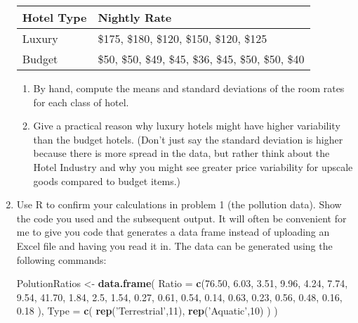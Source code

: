 \documentclass[]{book}
\newenvironment{Shaded}{\begin{snugshade}}{\end{snugshade}}
\newcommand{\KeywordTok}[1]{\textcolor[rgb]{0.13,0.29,0.53}{\textbf{{#1}}}}
\newcommand{\DataTypeTok}[1]{\textcolor[rgb]{0.13,0.29,0.53}{{#1}}}
\newcommand{\DecValTok}[1]{\textcolor[rgb]{0.00,0.00,0.81}{{#1}}}
\newcommand{\FloatTok}[1]{\textcolor[rgb]{0.00,0.00,0.81}{{#1}}}
\newcommand{\StringTok}[1]{\textcolor[rgb]{0.31,0.60,0.02}{{#1}}}
\newcommand{\NormalTok}[1]{{#1}}
\providecommand{\tightlist}{%
  \setlength{\itemsep}{0pt}\setlength{\parskip}{0pt}}
\begin{document}
\begin{enumerate}
  \begin{longtable}[]{@{}ll@{}}
  \toprule
  Hotel Type & Nightly Rate\tabularnewline
  \midrule
  \endhead
  Luxury & \$175, \$180, \$120, \$150, \$120, \$125\tabularnewline
  Budget & \$50, \$50, \$49, \$45, \$36, \$45, \$50, \$50,
  \$40\tabularnewline
  \bottomrule
  \end{longtable}

  \begin{enumerate}
  \def\labelenumii{\alph{enumii})}
  \tightlist
  \item
    By hand, compute the means and standard deviations of the room rates
    for each class of hotel.
  \item
    Give a practical reason why luxury hotels might have higher
    variability than the budget hotels. (Don't just say the standard
    deviation is higher because there is more spread in the data, but
    rather think about the Hotel Industry and why you might see greater
    price variability for upscale goods compared to budget items.)
  \end{enumerate}
\item
  Use R to confirm your calculations in problem 1 (the pollution data).
  Show the code you used and the subsequent output. It will often be
  convenient for me to give you code that generates a data frame instead
  of uploading an Excel file and having you read it in. The data can be
  generated using the following commands:

\begin{Shaded}
\begin{Highlighting}[]
\NormalTok{PolutionRatios <-}\StringTok{ }\KeywordTok{data.frame}\NormalTok{(}
  \DataTypeTok{Ratio =} \KeywordTok{c}\NormalTok{(}\FloatTok{76.50}\NormalTok{, }\FloatTok{6.03}\NormalTok{, }\FloatTok{3.51}\NormalTok{, }\FloatTok{9.96}\NormalTok{, }\FloatTok{4.24}\NormalTok{, }\FloatTok{7.74}\NormalTok{, }\FloatTok{9.54}\NormalTok{, }\FloatTok{41.70}\NormalTok{, }\FloatTok{1.84}\NormalTok{, }\FloatTok{2.5}\NormalTok{, }\FloatTok{1.54}\NormalTok{,}
             \FloatTok{0.27}\NormalTok{, }\FloatTok{0.61}\NormalTok{, }\FloatTok{0.54}\NormalTok{, }\FloatTok{0.14}\NormalTok{, }\FloatTok{0.63}\NormalTok{, }\FloatTok{0.23}\NormalTok{, }\FloatTok{0.56}\NormalTok{,  }\FloatTok{0.48}\NormalTok{, }\FloatTok{0.16}\NormalTok{, }\FloatTok{0.18}       \NormalTok{),}
  \DataTypeTok{Type  =} \KeywordTok{c}\NormalTok{( }\KeywordTok{rep}\NormalTok{(}\StringTok{'Terrestrial'}\NormalTok{,}\DecValTok{11}\NormalTok{), }\KeywordTok{rep}\NormalTok{(}\StringTok{'Aquatic'}\NormalTok{,}\DecValTok{10}\NormalTok{) ) )}


\end{Highlighting}
\end{Shaded}
\end{enumerate}
\end{document}
